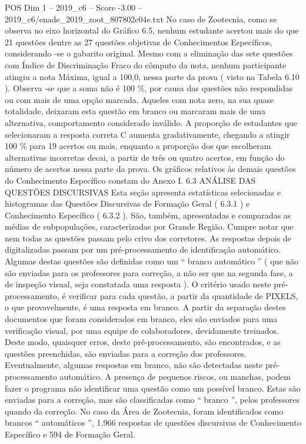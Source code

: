 \begin{textsample}{POS Dim 1 – 2019\_c6 – Score -3.00 – 2019\_c6/enade\_2019\_zoot\_807802c04e.txt}
No caso de Zootecnia, como se observa no eixo horizontal do Gráfico 6.5, nenhum estudante acertou mais do que 21 questões dentre as 27 questões objetivas de Conhecimentos Específicos, considerando -se o gabarito original.
Mesmo com a eliminação das sete questões com Índice de Discriminação Fraco do cômputo da nota, nenhum participante atingiu a nota Máxima, igual a 100,0, nessa parte da prova ( visto na Tabela 6.10 ).
Observa -se que a soma não é 100 \%, por causa das questões não respondidas ou com mais de uma opção marcada.
Aqueles com nota zero, na sua quase totalidade, deixaram esta questão em branco ou marcaram mais de uma alternativa, comportamento considerado inválido.
A proporção de estudantes que selecionaram a resposta correta C aumenta gradativamente, chegando a atingir 100 \% para 19 acertos ou mais, enquanto a proporção dos que escolheram alternativas incorretas decai, a partir de três ou quatro acertos, em função do número de acertos nessa parte da prova.
Os gráficos relativos às demais questões do Conhecimento Específico constam do Anexo I. 6.3 ANÁLISE DAS QUESTÕES DISCURSIVAS Esta seção apresenta estatísticas selecionadas e histogramas das Questões Discursivas de Formação Geral ( 6.3.1 ) e Conhecimento Específico ( 6.3.2 ).
São, também, apresentadas e comparadas as médias de subpopulações, caracterizadas por Grande Região.
Cumpre notar que nem todas as questões passam pelo crivo dos corretores.
As respostas depois de digitalizadas passam por um pré-processamento de identificação automático.
Algumas destas questões são definidas como um “ branco automático ” ( que não são enviadas para os professores para correção, a não ser que na segunda fase, a de inspeção visual, seja constatada uma resposta ).
O critério usado neste pré-processamento, é verificar para cada questão, a partir da quantidade de PIXELS, o que provavelmente, é uma resposta em branco.
A partir da separação destes documentos que foram considerados em branco, eles são enviados para uma verificação visual, por uma equipe de colaboradores, devidamente treinados.
Deste modo, quaisquer erros, deste pré-processamento, são encontrados, e as questões preenchidas, são enviadas para a correção dos professores.
Eventualmente, algumas respostas em branco, não são detectadas neste pré-processamento automático.
A presença de pequenos riscos, ou manchas, podem fazer o programa não identificar uma questão como um possível branco.
Estas são enviadas para a correção, mas são classificadas como “ branco ”, pelos professores quando da correção.
No caso da Área de Zootecnia, foram identificados como brancos “ automáticos ”, 1.966 respostas de questões discursivas de Conhecimento Específico e 594 de Formação Geral.

\end{textsample}
